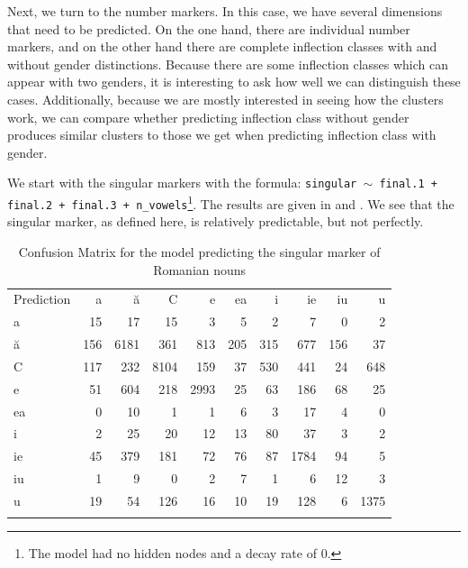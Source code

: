 Next, we turn to the number markers. In this case, we have several dimensions that need to be predicted. On the one hand, there are individual number markers, and on the other hand there are complete inflection classes with and without gender distinctions. Because there are some inflection classes which can appear with two genders, it is interesting to ask how well we can distinguish these cases.  Additionally, because we are mostly interested in seeing how the clusters work, we can compare whether predicting inflection class without gender produces similar clusters to those we get when predicting inflection class with gender.

We start with the singular markers with the formula: \texttt{singular $\sim$ final.1 + final.2 + final.3 + n\_vowels}\footnote{The model had no hidden nodes and a decay rate of 0.}. The results are given in  and . We see that the singular marker, as defined here, is relatively predictable, but not perfectly.

\begin{table}
  \centering
  \begin{tabular}{lrrrrrrrrr}
    \lsptoprule
    \multicolumn{10}{c}{Reference}                                         \\
    \midrule
    Prediction & a   & ă    & C    & e    & ea  & i   & ie   & iu  & u    \\
    a          & 15  & 17   & 15   & 3    & 5   & 2   & 7    & 0   & 2    \\
    ă          & 156 & 6181 & 361  & 813  & 205 & 315 & 677  & 156 & 37   \\
    C          & 117 & 232  & 8104 & 159  & 37  & 530 & 441  & 24  & 648  \\
    e          & 51  & 604  & 218  & 2993 & 25  & 63  & 186  & 68  & 25   \\
    ea         & 0   & 10   & 1    & 1    & 6   & 3   & 17   & 4   & 0    \\
    i          & 2   & 25   & 20   & 12   & 13  & 80  & 37   & 3   & 2    \\
    ie         & 45  & 379  & 181  & 72   & 76  & 87  & 1784 & 94  & 5    \\
    iu         & 1   & 9    & 0    & 2    & 7   & 1   & 6    & 12  & 3    \\
    u          & 19  & 54   & 126  & 16   & 10  & 19  & 128  & 6   & 1375 \\
    \lspbottomrule
  \end{tabular}
  \caption{Confusion Matrix for the model predicting the singular marker of Romanian nouns}\label{tab:singular-romanian}
\end{table}

